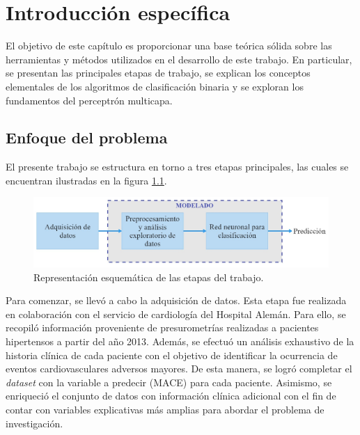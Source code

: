 \chapter{Introducción específica} %

\label{Chapter2}

El objetivo de este capítulo es proporcionar una base teórica sólida sobre las herramientas y 
métodos utilizados en el desarrollo de este trabajo. En particular,  se presentan las principales 
etapas de trabajo, se explican los conceptos elementales de los algoritmos de clasificación binaria 
y se exploran los fundamentos del perceptrón multicapa.

\section{Enfoque del problema}
\label{sec:Enfoque del problema}

El presente trabajo se estructura en torno a tres etapas principales, las cuales se 
encuentran ilustradas en la figura \ref{fig:Etapas de trabajo}.


\begin{figure}[ht]
	\centering
	\includegraphics[width=\textwidth]{./Figures/Etapas de trabajo.jpg}
	\caption{Representación esquemática de las etapas del trabajo.}\label{fig:Etapas de trabajo}
\end{figure}

Para comenzar, se llevó a cabo la adquisición de datos. 
Esta etapa fue realizada en colaboración con el servicio de cardiología del Hospital Alemán. 
Para ello, se recopiló información proveniente de presurometrías realizadas a pacientes 
hipertensos a partir del año 2013. Además, se efectuó un análisis exhaustivo de la historia 
clínica de cada paciente con el objetivo de identificar la ocurrencia de eventos cardiovasculares 
adversos mayores. De esta manera, se logró completar el \textit{dataset} con la variable a predecir (MACE) 
para cada paciente. Asimismo, se enriqueció el conjunto de datos con información clínica adicional 
con el fin de contar con variables explicativas más amplias para abordar el problema de investigación.

